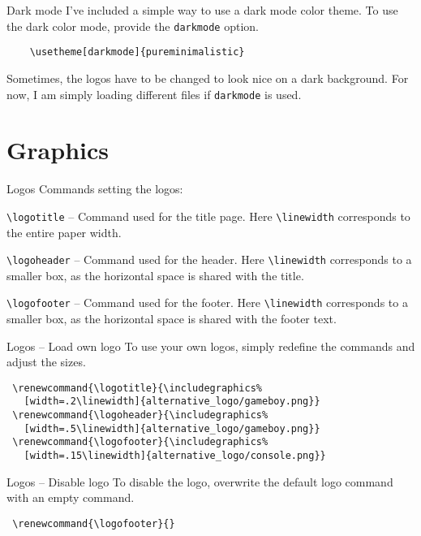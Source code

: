 \documentclass[aspectratio=169]{beamer}
\begin{document}
\begin{frame}[fragile]{Dark mode}
  I've included a simple way to use a dark mode
  color theme. To use the dark color mode, provide the \texttt{darkmode}
  option.
  \begin{verbatim}
    \usetheme[darkmode]{pureminimalistic}
    \end{verbatim}
  Sometimes, the logos have to be changed to look nice on a
  dark background. For now, I am simply loading different
  files if \texttt{darkmode} is used.
\end{frame}

\section{Graphics}
\begin{frame}{Logos}
  Commands setting the logos:
  \begin{vfilleditems}
    \item \texttt{\textbackslash{}logotitle} -- Command used for the title page.
    Here \texttt{\textbackslash{}linewidth} corresponds to the entire paper width.
    \item \texttt{\textbackslash{}logoheader} -- Command used for the header.
    Here \texttt{\textbackslash{}linewidth} corresponds to a smaller box,
    as the horizontal space is shared with the title.
    \item \texttt{\textbackslash{}logofooter} -- Command used for the footer.
    Here \texttt{\textbackslash{}linewidth} corresponds to a smaller box,
    as the horizontal space is shared with the footer text.
  \end{vfilleditems}
\end{frame}

\begin{frame}[fragile]{Logos -- Load own logo}
  To use your own logos, simply redefine the commands and adjust the sizes.
  \begin{verbatim}
 \renewcommand{\logotitle}{\includegraphics%
   [width=.2\linewidth]{alternative_logo/gameboy.png}}
 \renewcommand{\logoheader}{\includegraphics%
   [width=.5\linewidth]{alternative_logo/gameboy.png}}
 \renewcommand{\logofooter}{\includegraphics%
   [width=.15\linewidth]{alternative_logo/console.png}}
  \end{verbatim}
\end{frame}

\begin{frame}[fragile]{Logos -- Disable logo}
  To disable the logo, overwrite the default logo command with an empty
  command.
  \begin{verbatim}
 \renewcommand{\logofooter}{}
  \end{verbatim}
\end{frame}
\end{document}

